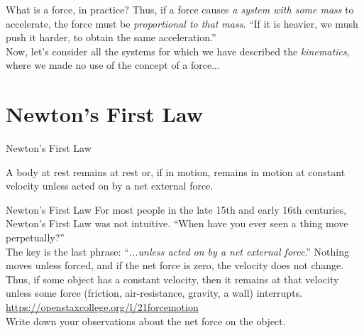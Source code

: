\documentclass{beamer}
\begin{document}
\begin{frame}{What is a force, in practice?}
Thus, if a force causes \textit{a system with some mass} to accelerate, the force must be \textit{proportional to that mass}.  \alert{``If it is heavier, we mush push it harder, to obtain the same acceleration.''}  \\
\vspace{1cm}
Now, let's consider all the systems for which we have described the \textit{kinematics}, where we made no use of the concept of a force...
\end{frame}

\section{Newton's First Law}

\begin{frame}{Newton's First Law}
\begin{tcolorbox}[colback=white,colframe=red!40!blue,title=Newton's First Law]
\alert{A body at rest remains at rest or, if in motion, remains in motion at constant velocity unless acted on by a net external force.}
\end{tcolorbox}
\end{frame}

\begin{frame}{Newton's First Law}
\small
For most people in the late 15th and early 16th centuries, Newton's First Law was not intuitive.  ``When have you ever seen a thing move perpetually?''\\
\vspace{0.5cm}
The key is the last phrase: ``\textit{...unless acted on by a \alert{net} external force}.''  Nothing moves unless forced, and if the \alert{net} force is zero, the velocity does not change.  Thus, if some object has a constant velocity, then it remains at that velocity unless some force (friction, air-resistance, gravity, a wall) interrupts. \\
\vspace{0.5cm}
\url{https://openstaxcollege.org/l/21forcemotion} \\
Write down your observations about the net force on the object.
\end{frame}
\end{document}
